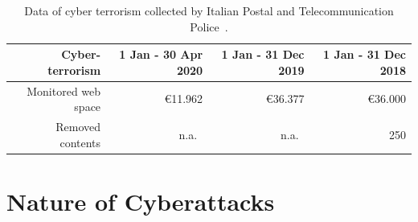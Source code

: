 \documentclass{easychair}
\begin{document}
\begin{table}[h]
  \begin{center}
    \end{center}
	\caption{Data of critical structure protection collected by Italian Postal and Telecommunication Police~\cite{oad20}.}									
	\label{tab:table2}									
\end{table}	

\begin{table}[h]
  \begin{center}
	\begin{tabular}{|r|r|r|r|}									
		\hline									
		\textbf{Cyber-terrorism}	&	1 Jan - 30 Apr 2020	&	1 Jan - 31 Dec 2019	&	1 Jan - 31 Dec 2018\\
		\hline									
		Monitored web space	&	\euro 11.962	&	\euro 36.377	&	\euro 36.000\\
		Removed contents 	&	n.a.\	&	n.a.\	&	250\\
		\hline	
	\end{tabular}
        \end{center}
	\caption{Data of cyber terrorism collected by Italian Postal and Telecommunication Police~\cite{oad20}.}									
	\label{tab:table3}									
\end{table}	

\section{Nature of Cyberattacks}\label{sec:TypeAttacks}
\end{document}
